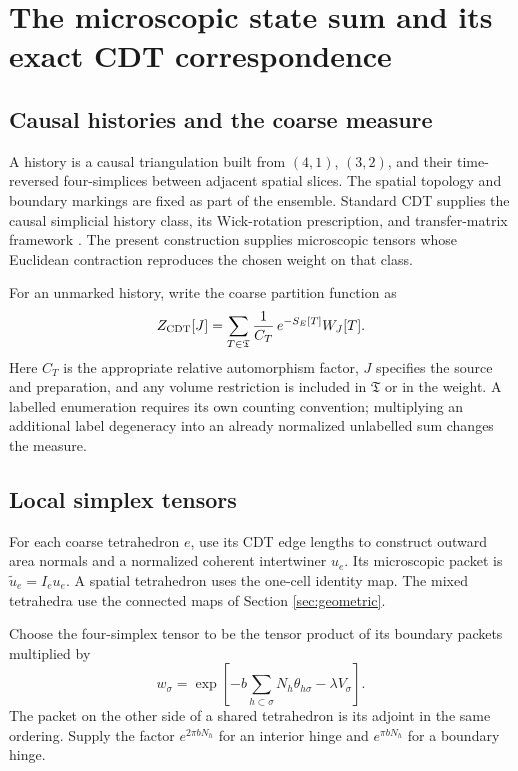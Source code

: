 \section{The microscopic state sum and its exact CDT correspondence}
\label{sec:statesum}

\subsection{Causal histories and the coarse measure}

A history is a causal triangulation built from $(4,1)$, $(3,2)$, and their time-reversed four-simplices between adjacent spatial slices. The spatial topology and boundary markings are fixed as part of the ensemble. Standard CDT supplies the causal simplicial history class, its Wick-rotation prescription, and transfer-matrix framework \cite{cdt}. The present construction supplies microscopic tensors whose Euclidean contraction reproduces the chosen weight on that class.

For an unmarked history, write the coarse partition function as
\begin{equation}
Z_{\rm CDT}[J]=\sum_{T\in\mathfrak T}
\frac{1}{C_T}\,e^{-S_E[T]}W_J[T].
\label{eq:Zcdt}
\end{equation}
Here $C_T$ is the appropriate relative automorphism factor, $J$ specifies the source and preparation, and any volume restriction is included in $\mathfrak T$ or in the weight. A labelled enumeration requires its own counting convention; multiplying an additional label degeneracy into an already normalized unlabelled sum changes the measure.

\subsection{Local simplex tensors}

For each coarse tetrahedron $e$, use its CDT edge lengths to construct outward area normals and a normalized coherent intertwiner $u_e$. Its microscopic packet is $\widetilde u_e=I_eu_e$. A spatial tetrahedron uses the one-cell identity map. The mixed tetrahedra use the connected maps of Section \ref{sec:geometric}.

Choose the four-simplex tensor to be the tensor product of its boundary packets multiplied by
\begin{equation}
w_\sigma=\exp\left[-b\sum_{h\subset\sigma}N_h\theta_{h\sigma}
-\lambda V_\sigma\right].
\end{equation}
The packet on the other side of a shared tetrahedron is its adjoint in the same ordering. Supply the factor $e^{2\pi bN_h}$ for an interior hinge and $e^{\pi bN_h}$ for a boundary hinge.

